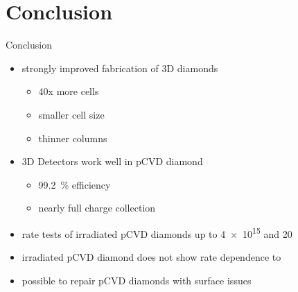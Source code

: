 \section{Conclusion}
\begin{frame}{Conclusion}

	\begin{minipage}[c][5cm]{\textwidth}
		\begin{itemize}\itemfill
			\item strongly improved fabrication of 3D diamonds
			\begin{itemize}
				\item 40x more cells
				\item smaller cell size
				\item thinner columns\vspace*{5pt}
			\end{itemize}
			\item 3D Detectors work well in pCVD diamond
			\begin{itemize}
				\item \SI{99.2}{\%} efficiency
				\item nearly full charge collection\vspace*{5pt}
			\end{itemize}
			\item rate tests of irradiated pCVD diamonds up to \SI{4e15}{\ncm} and \SI{20}{\mhzcm}
			\item irradiated pCVD diamond does not show rate dependence to  
			\item possible to repair pCVD diamonds with surface issues
		\end{itemize}
	\end{minipage}
	
\end{frame}
